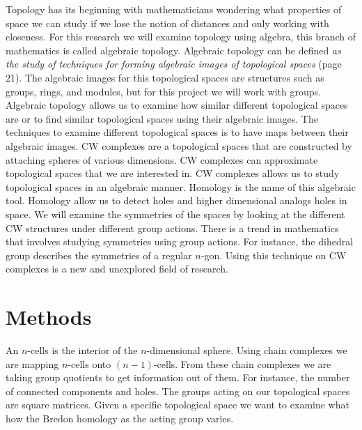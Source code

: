 \documentclass[12pt]{article}
\begin{document}
Topology has its beginning with mathematicians wondering what properties of space we can study if we lose the notion of distances and only working with closeness.\cite{Allen_Hatcher_2001}
For this research we will examine topology using algebra, this branch of mathematics is called algebraic topology.\cite{Allen_Hatcher_2001} Algebraic topology can be defined \textit{as the study of techniques for forming algebraic images of topological spaces}  (page 21).\cite{Allen_Hatcher_2001} The algebraic images for this topological spaces are structures such as groups, rings, and modules, but for this project we will work with groups.\cite{Allen_Hatcher_2001}
Algebraic topology allows us to examine how similar different topological spaces are or to find similar topological spaces using their algebraic images.\cite{Allen_Hatcher_2001}
The techniques to examine different topological spaces is to have maps between their algebraic images.\cite{Allen_Hatcher_2001}\newline
CW complexes are a topological spaces that are constructed by attaching spheres of various dimensions.\cite{Allen_Hatcher_2001}
CW complexes can approximate topological spaces that we are interested in. CW complexes allows us to study topological spaces in an algebraic manner. Homology is the name of this algebraic tool. Homology allow us to detect holes and higher dimensional analogs holes in space.\newline
We will examine the symmetries of the spaces by looking at the different CW structures under different group actions. There is a trend in mathematics that involves studying symmetries using group actions. For instance, the dihedral group describes the symmetries of a regular $n$-gon. Using this technique on CW complexes is a new and unexplored field of research.

\section{Methods}
An $n$-cells is the interior of the $n$-dimensional sphere. Using chain complexes we are mapping $n$-cells onto $(n-1)$-cells. From these chain complexes we are taking group quotients to get information out of them. For instance, the number of connected components and holes.\cite{Beaudry}\newline
The groups acting on our topological spaces are square matrices. Given a specific topological space we want to examine what how the Bredon homology as the acting group varies.\cite{Beaudry}\newline
\end{document}
